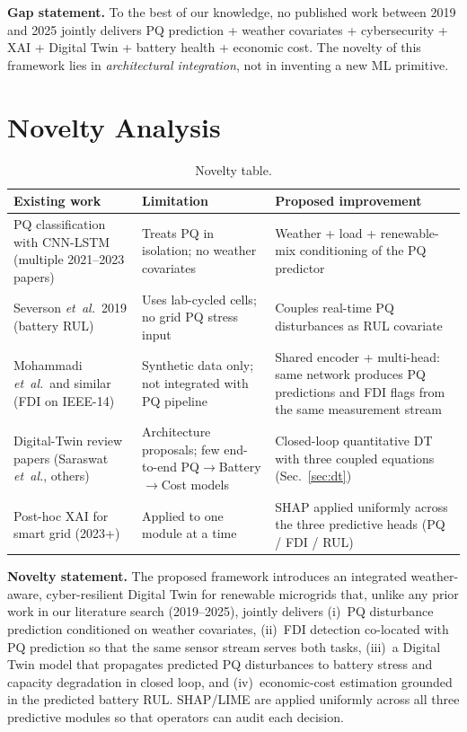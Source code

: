 \documentclass[11pt,a4paper]{article}
\begin{document}
\textbf{Gap statement.} To the best of our knowledge, no published work
between 2019 and 2025 jointly delivers PQ prediction + weather covariates
+ cybersecurity + XAI + Digital Twin + battery health + economic cost.
The novelty of this framework lies in \emph{architectural integration},
not in inventing a new ML primitive.

\section{Novelty Analysis}

\begin{table}[H]
\centering
\small
\begin{tabular}{p{4.0cm}p{4.6cm}p{6.0cm}}
\toprule
\textbf{Existing work} & \textbf{Limitation} & \textbf{Proposed improvement} \\
\midrule
PQ classification with CNN-LSTM (multiple 2021--2023 papers) &
Treats PQ in isolation; no weather covariates &
Weather + load + renewable-mix conditioning of the PQ predictor \\

Severson \textit{et~al.}~2019 (battery RUL) &
Uses lab-cycled cells; no grid PQ stress input &
Couples real-time PQ disturbances as RUL covariate \\

Mohammadi \textit{et~al.}~and similar (FDI on IEEE-14) &
Synthetic data only; not integrated with PQ pipeline &
Shared encoder + multi-head: same network produces PQ predictions and
FDI flags from the same measurement stream \\

Digital-Twin review papers (Saraswat \textit{et~al.}, others) &
Architecture proposals; few end-to-end PQ$\rightarrow$Battery$\rightarrow$Cost models &
Closed-loop quantitative DT with three coupled equations (Sec.~\ref{sec:dt}) \\

Post-hoc XAI for smart grid (2023+) &
Applied to one module at a time &
SHAP applied uniformly across the three predictive heads (PQ / FDI / RUL) \\
\bottomrule
\end{tabular}
\caption{Novelty table.}
\end{table}

\textbf{Novelty statement.}\enspace
The proposed framework introduces an integrated weather-aware,
cyber-resilient Digital Twin for renewable microgrids that, unlike any
prior work in our literature search (2019--2025), jointly delivers
(i)~PQ disturbance prediction conditioned on weather covariates,
(ii)~FDI detection co-located with PQ prediction so that the same
sensor stream serves both tasks,
(iii)~a Digital Twin model that propagates predicted PQ disturbances to
battery stress and capacity degradation in closed loop, and
(iv)~economic-cost estimation grounded in the predicted battery RUL.
SHAP/LIME are applied uniformly across all three predictive modules so
that operators can audit each decision.
\end{document}

